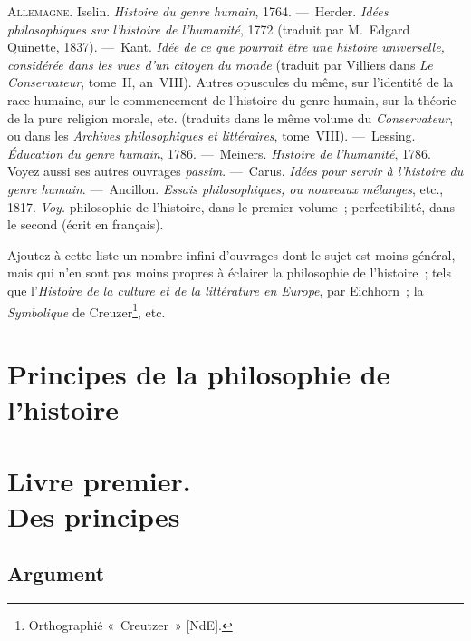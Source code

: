 \documentclass[french,twoside]{book} %
\newcommand{\byline}[1]{\bigskip{\RaggedLeft{#1}\par}\bigskip}
\newcommand\chapteropen{} %
\newcommand\chaptercont{} %
\begin{document}
{\scshape Allemagne.} Iselin. {\itshape Histoire du genre humain}, 1764. — Herder.  {\itshape Idées philosophiques sur l’histoire de l’humanité}, 1772 (traduit par M. Edgard Quinette, 1837). — Kant. {\itshape Idée de ce que pourrait être une histoire universelle, considérée dans les vues d’un citoyen du monde} (traduit par Villiers dans {\itshape Le Conservateur}, tome II, an VIII). Autres opuscules du même, sur l’identité de la race humaine, sur le commencement de l’histoire du genre humain, sur la théorie de la pure religion morale, etc. (traduits dans le même volume du {\itshape Conservateur}, ou dans les {\itshape Archives philosophiques et littéraires}, tome VIII). — Lessing. {\itshape Éducation du genre humain}, 1786. — Meiners. {\itshape Histoire de l’humanité}, 1786. Voyez aussi ses autres ouvrages {\itshape passim}. — Carus. {\itshape Idées pour servir à l’histoire du genre humain}. — Ancillon. {\itshape Essais philosophiques, ou nouveaux mélanges}, etc., 1817. {\itshape Voy.} philosophie de l’histoire, dans le premier volume ; perfectibilité, dans le second (écrit en français).\par
Ajoutez à cette liste un nombre infini d’ouvrages dont le sujet est moins général, mais qui n’en sont pas moins propres à éclairer la philosophie de l’histoire ; tels que l’{\itshape Histoire de la culture et de la littérature en Europe}, par Eichhorn ; la {\itshape Symbolique} de Creuzer\footnote{Orthographié « Creutzer » [NdE].}, etc.\par

\byline{}

\chapteropen
\part[{Principes de la philosophie de l’histoire}]{Principes de la philosophie de l’histoire}\renewcommand{\leftmark}{Principes de la philosophie de l’histoire}


\byline{}

\chaptercont

\chapteropen
\part[{Livre premier. Des principes}]{Livre premier. \\
Des principes}

\chaptercont

\chapteropen
\chapter[{Argument}]{Argument}
\end{document}
